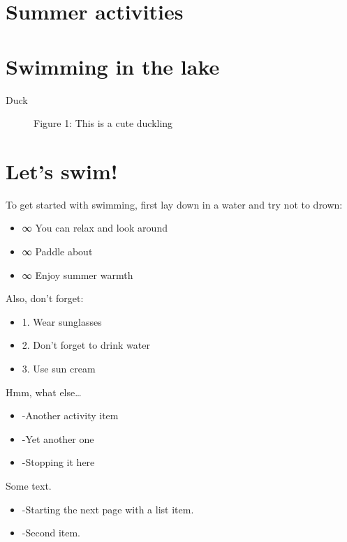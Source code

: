 \documentclass[11pt,a4paper]{article}
\begin{document}
\section{Summer activities}

\section{Swimming in the lake}

Duck

\begin{figure}[h]
\caption{Figure 1: This is a cute duckling}
\end{figure}

\section{Let's swim!}

To get started with swimming, first lay down in a water and try not to drown:

\begin{itemize}
\item ∞ You can relax and look around
\item ∞ Paddle about
\item ∞ Enjoy summer warmth
\end{itemize}

Also, don't forget:

\begin{itemize}
\item 1. Wear sunglasses
\item 2. Don't forget to drink water
\item 3. Use sun cream
\end{itemize}

Hmm, what else…

\begin{itemize}
\item -Another activity item
\item -Yet another one
\item -Stopping it here
\end{itemize}

Some text.

\begin{itemize}
\item -Starting the next page with a list item.
\item -Second item.
\end{itemize}
\end{document}
